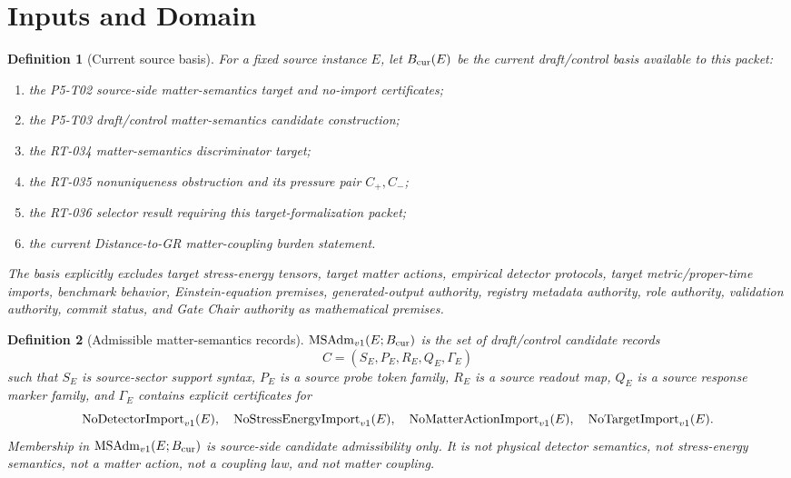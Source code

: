 \newtheorem{definition}{Definition}
\newtheorem{proposition}{Proposition}

\section{Inputs and Domain}

\begin{definition}[Current source basis]
For a fixed source instance \(E\), let \(B_{\mathrm{cur}}(E)\) be the current
draft/control basis available to this packet:
\begin{enumerate}
  \item the P5-T02 source-side matter-semantics target and no-import
    certificates;
  \item the P5-T03 draft/control matter-semantics candidate construction;
  \item the RT-034 matter-semantics discriminator target;
  \item the RT-035 nonuniqueness obstruction and its pressure pair
    \(C_+,C_-\);
  \item the RT-036 selector result requiring this target-formalization
    packet;
  \item the current Distance-to-GR matter-coupling burden statement.
\end{enumerate}
The basis explicitly excludes target stress-energy tensors, target matter
actions, empirical detector protocols, target metric/proper-time imports,
benchmark behavior, Einstein-equation premises, generated-output authority,
registry metadata authority, role authority, validation authority, commit
status, and Gate Chair authority as mathematical premises.
\end{definition}

\begin{definition}[Admissible matter-semantics records]
\(\mathrm{MSAdm}_{v1}(E;B_{\mathrm{cur}})\) is the set of draft/control candidate records
\[
  C=(S_E,P_E,R_E,Q_E,\Gamma_E)
\]
such that \(S_E\) is source-sector support syntax, \(P_E\) is a source probe
token family, \(R_E\) is a source readout map, \(Q_E\) is a source response
marker family, and \(\Gamma_E\) contains explicit certificates for
\[
  \mathrm{NoDetectorImport}_{v1}(E),\quad \mathrm{NoStressEnergyImport}_{v1}(E),\quad \mathrm{NoMatterActionImport}_{v1}(E),\quad \mathrm{NoTargetImport}_{v1}(E).
\]
Membership in \(\mathrm{MSAdm}_{v1}(E;B_{\mathrm{cur}})\) is source-side candidate admissibility only.
It is not physical detector semantics, not stress-energy semantics, not a
matter action, not a coupling law, and not matter coupling.
\end{definition}

